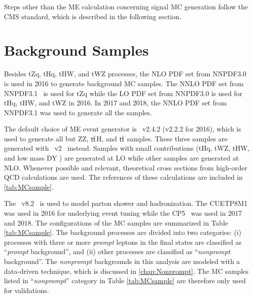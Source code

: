 Steps other than the \ac{ME} calculation concerning signal \ac{MC} generation follow the \ac{CMS} standard, which is described in the following section.
\section{Background Samples}
\label{sec:Backgrounds}

Besides tZq, tHq, tHW, and tWZ processes, the \ac{NLO} \ac{PDF} set from NNPDF3.0~\cite{NNPDF:2014otw} is used in 2016 to generate background \ac{MC} samples. The \ac{NNLO} \ac{PDF} set from NNPDF3.1~\cite{NNPDF:2017mvq} is used for tZq while the \ac{LO} \ac{PDF} set from NNPDF3.0 is used for tHq, tHW, and tWZ in 2016. In 2017 and 2018, the \ac{NNLO} \ac{PDF} set from NNPDF3.1 was used to generate all the samples. 

The default choice of \ac{ME} event generator is \MG~v2.4.2 (v2.2.2 for 2016), which is used to generate all but ZZ, $\textsf{t}\overline{\textsf{t}}$H, and $\textsf{t}\overline{\textsf{t}}$ samples. These three samples are generated with \Pow~v2~\cite{Frixione:2007vw} instead. Samples with small contributions (tHq, tWZ, tHW, and low mass \ac{DY} ) are generated at \ac{LO} while other samples are generated at \ac{NLO}. Whenever possible and relevant, theoretical cross sections from high-order \ac{QCD} calculations are used. The references of these calculations are included in \ref{tab:MCsample}.

The \PY~v8.2~\cite{Sjostrand:2014zea} is used to model parton shower and hadronization. The CUETP8M1~\cite{CMS:2015wcf} was used in 2016 for underlying event tuning while the CP5~\cite{CMS:2019csb} was used in 2017 and 2018. The configurations of the \ac{MC} samples are summarized in Table \ref{tab:MCsample}. The background processes are divided into two categories: (i) processes with three or more \emph{prompt} leptons in the final states are classified as ``\emph{prompt} background'', and (ii) other processes are classified as ``\emph{nonprompt} background''. The \emph{nonprompt} backgrounds in this analysis are modeled with a data-driven technique, which is discussed in \autoref{chap:Nonprompt}. The \ac{MC} samples listed in ``\emph{nonprompt}'' category in Table \ref{tab:MCsample} are therefore only used for validations. 

